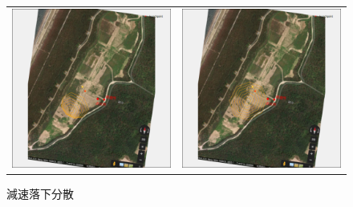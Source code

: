 \documentclass[a4paper]{jarticle}
\begin{document}
\begin{figure}[H]
  \begin{tabular}{cc}
    \centering
    \begin{minipage}{0.45\hsize}
       \includegraphics[scale=0.35]{./LandingPlotHard.eps}
       \caption{弾道落下分散}
      \end{minipage} &
    \begin{minipage}{0.45\hsize}
      \includegraphics[scale=0.35]{./LandingPlotSoft.eps}
      \caption{減速落下分散}
    \end{minipage}
  \end{tabular}
\end{figure}
\end{document}
